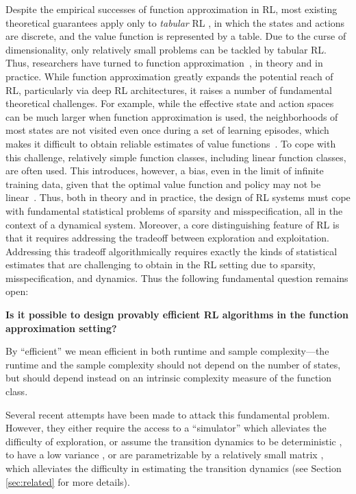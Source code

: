 Despite the empirical successes of function approximation in RL, 
most existing theoretical guarantees apply only to \emph{tabular} 
RL \cite[see, e.g.,][]{jaksch2010near,osband2014generalization,azar2017minimax,
jin2018q}, in which the states and actions are discrete, and the value 
function is represented by a table. Due to the  
curse of dimensionality, only relatively small problems can be tackled by tabular RL.  Thus, researchers have turned to function 
approximation~\cite[see, e.g.,][]{sutton1988learning, bradtke1996linear, 
tsitsiklis1997analysis}, in theory and in practice.  While function approximation greatly expands the potential
reach of RL, particularly via deep RL architectures, it 
raises a number of fundamental theoretical challenges.  For example,
while the effective state and action spaces can be much larger when function approximation is used, the neighborhoods 
of most states are not visited even once during a set of learning episodes, which makes it difficult to obtain reliable estimates of value functions~\cite[see, e.g.,][]{sutton2011reinforcement, szepesvari2010algorithms, lattimore2018bandit}. To cope with this challenge, relatively simple function classes, including linear function classes, are often used. This introduces, however, a bias, even in the limit of infinite training data, given that the optimal value function and policy may not be linear~\cite[see, e.g.,][]{baird1995residual, boyan1995generalization, tsitsiklis1997analysis}. Thus, both in theory and in practice, the design of RL systems must cope with fundamental statistical problems of sparsity and misspecification, all in the context of a dynamical system.  Moreover, a core distinguishing feature of RL is that it requires addressing the tradeoff between exploration and exploitation.  Addressing this tradeoff algorithmically requires exactly the kinds of statistical estimates that are challenging to obtain in the RL setting due to sparsity, misspecification, and dynamics.  Thus the following fundamental question remains open: %
\begin{center}
\textbf{Is it possible to design provably efficient RL algorithms in the function approximation setting?}
\end{center}
By ``efficient'' we mean efficient in both runtime and sample complexity---the runtime and the sample complexity should not depend on the number of states, but should depend instead on an intrinsic complexity measure of the function class.  

Several recent attempts have been made to attack this fundamental problem. However, they either require the access to a ``simulator'' \cite{yang2019sample} which alleviates the difficulty of exploration, or assume the transition dynamics to be deterministic \cite{wen2013efficient,wen2017efficient}, to have a low variance \cite{du2019provably}, or are parametrizable by a relatively small matrix \cite{yang2019reinforcement}, which alleviates the difficulty in estimating the transition dynamics (see Section \ref{sec:related} for more details).

